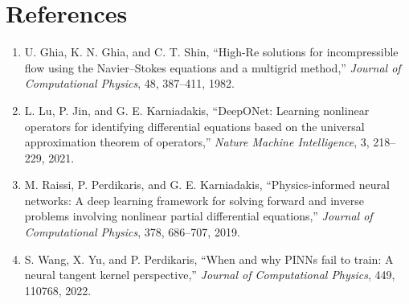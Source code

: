 \documentclass[11pt]{article}
\begin{document}
\section*{References}
\begin{enumerate}
\item U. Ghia, K. N. Ghia, and C. T. Shin, ``High-Re solutions for incompressible flow using the Navier--Stokes equations and a multigrid method,'' \emph{Journal of Computational Physics}, 48, 387--411, 1982.
\item L. Lu, P. Jin, and G. E. Karniadakis, ``DeepONet: Learning nonlinear operators for identifying differential equations based on the universal approximation theorem of operators,'' \emph{Nature Machine Intelligence}, 3, 218--229, 2021.
\item M. Raissi, P. Perdikaris, and G. E. Karniadakis, ``Physics-informed neural networks: A deep learning framework for solving forward and inverse problems involving nonlinear partial differential equations,'' \emph{Journal of Computational Physics}, 378, 686--707, 2019.
\item S. Wang, X. Yu, and P. Perdikaris, ``When and why PINNs fail to train: A neural tangent kernel perspective,'' \emph{Journal of Computational Physics}, 449, 110768, 2022.
\end{enumerate}
\end{document}
